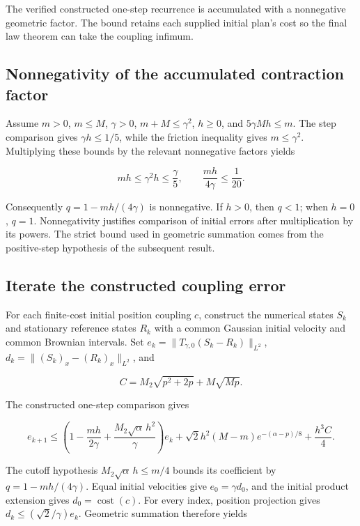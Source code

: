 \documentclass[11pt,a4paper]{report}
\begin{document}
The verified constructed one-step recurrence is accumulated with a nonnegative geometric factor. The bound retains each supplied initial plan’s cost so the final law theorem can take the coupling infimum.

\subsection{\texorpdfstring{Nonnegativity of the accumulated contraction factor}{Nonnegativity of the accumulated contraction factor}}
\label{report-step-KineticLangevin-CanonicalKLMC2Bound-lean-1}


Assume \(m>0\), \(m\le M\), \(\gamma>0\), \(m+M\le\gamma^2\), \(h\ge0\), and \(5\gamma Mh\le m\). The step comparison gives \(\gamma h\le1/5\), while the friction inequality gives \(m\le\gamma^2\). Multiplying these bounds by the relevant nonnegative factors yields

\[mh\le\gamma^2h\le\frac\gamma5,\qquad\frac{mh}{4\gamma}\le\frac1{20}.\]

Consequently \(q=1-mh/(4\gamma)\) is nonnegative. If \(h>0\), then \(q<1\); when \(h=0\), \(q=1\). Nonnegativity justifies comparison of initial errors after multiplication by its powers. The strict bound used in geometric summation comes from the positive-step hypothesis of the subsequent result.

\subsection{\texorpdfstring{Iterate the constructed coupling error}{Iterate the constructed coupling error}}
\label{report-step-KineticLangevin-CanonicalKLMC2Bound-lean-2}


For each finite-cost initial position coupling \(c\), construct the numerical states \(S_k\) and stationary reference states \(R_k\) with a common Gaussian initial velocity and common Brownian intervals. Set \(e_k=\|T_{\gamma,0}(S_k-R_k)\|_{L^2}\), \(d_k=\|(S_k)_x-(R_k)_x\|_{L^2}\), and

\[C=M_2\sqrt{p^2+2p}+M\sqrt{Mp}.\]

The constructed one-step comparison gives

\[e_{k+1}\le\left(1-\frac{mh}{2\gamma}+\frac{M_2\sqrt\alpha\,h^2}{\gamma}\right)e_k+\sqrt2h^2(M-m)e^{-(\alpha-p)/8}+\frac{h^3C}{4}.\]

The cutoff hypothesis \(M_2\sqrt\alpha\,h\le m/4\) bounds its coefficient by \(q=1-mh/(4\gamma)\). Equal initial velocities give \(e_0=\gamma d_0\), and the initial product extension gives \(d_0=\operatorname{cost}(c)\). For every index, position projection gives \(d_k\le(\sqrt2/\gamma)e_k\). Geometric summation therefore yields
\end{document}
